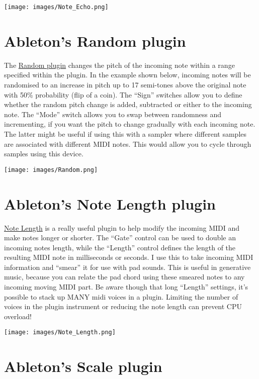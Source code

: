 \documentclass[
  12pt,
  letterpaper,
  oneside,
  open=any]{scrbook}
\begin{document}
\texttt{[image: images/Note\_Echo.png]}

\section{Ableton's Random plugin}\label{abletons-random-plugin}

The
\href{https://www.ableton.com/en/live-manual/11/live-midi-effect-reference/\#random}{Random
plugin} changes the pitch of the incoming note within a range specified
within the plugin. In the example shown below, incoming notes will be
randomised to an increase in pitch up to 17 semi-tones above the
original note with 50\% probability (flip of a coin). The ``Sign''
switches allow you to define whether the random pitch change is added,
subtracted or either to the incoming note. The ``Mode'' switch allows
you to swap between randomness and incrementing, if you want the pitch
to change gradually with each incoming note. The latter might be useful
if using this with a sampler where different samples are associated with
different MIDI notes. This would allow you to cycle through samples
using this device.

\texttt{[image: images/Random.png]}

\section{Ableton's Note Length
plugin}\label{abletons-note-length-plugin}

\href{https://www.ableton.com/en/live-manual/11/live-midi-effect-reference/\#note-length}{Note
Length} is a really useful plugin to help modify the incoming MIDI and
make notes longer or shorter. The ``Gate'' control can be used to double
an incoming notes length, while the ``Length'' control defines the
length of the resulting MIDI note in milliseconds or seconds. I use this
to take incoming MIDI information and ``smear'' it for use with pad
sounds. This is useful in generative music, because you can relate the
pad chord using these smeared notes to any incoming moving MIDI part. Be
aware though that long ``Length'' settings, it's possible to stack up
MANY midi voices in a plugin. Limiting the number of voices in the
plugin instrument or reducing the note length can prevent CPU overload!

\texttt{[image: images/Note\_Length.png]}

\section{Ableton's Scale plugin}\label{abletons-scale-plugin}
\end{document}
